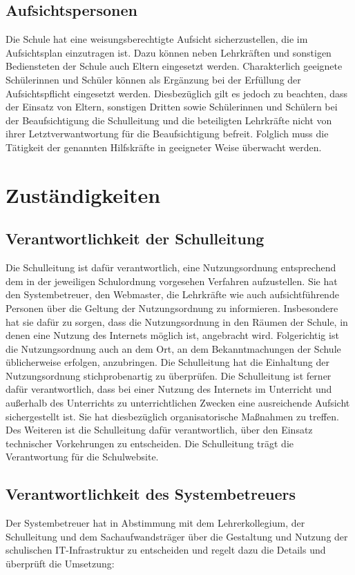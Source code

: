 \documentclass[a4paper, parskip]{scrartcl}
\begin{document}
\subsection{Aufsichtspersonen}
Die Schule hat eine weisungsberechtigte Aufsicht sicherzustellen, die im
Aufsichtsplan einzutragen ist. Dazu können neben Lehrkräften und sonstigen
Bediensteten der Schule auch Eltern eingesetzt werden. Charakterlich geeignete
Schülerinnen und Schüler können als Ergänzung bei der Erfüllung der
Aufsichtspflicht eingesetzt werden. Diesbezüglich gilt es jedoch zu beachten,
dass der Einsatz von Eltern, sonstigen Dritten sowie Schülerinnen und Schülern
bei der Beaufsichtigung die Schulleitung und die beteiligten Lehrkräfte nicht
von ihrer Letztverwantwortung für die Beaufsichtigung befreit. Folglich muss
die Tätigkeit der genannten Hilfskräfte in geeigneter Weise überwacht werden.

\section{Zuständigkeiten}
\subsection{Verantwortlichkeit der Schulleitung}
Die Schulleitung ist dafür verantwortlich, eine Nutzungsordnung entsprechend
dem in der jeweiligen Schulordnung vorgesehen Verfahren aufzustellen. Sie hat
den Systembetreuer, den Webmaster, die Lehrkräfte wie auch aufsichtführende
Personen über die Geltung der Nutzungsordnung zu informieren. Insbesondere hat
sie dafür zu sorgen, dass die Nutzungsordnung in den Räumen der Schule, in
denen eine Nutzung des Internets möglich ist, angebracht wird. Folgerichtig ist
die Nutzungsordnung auch an dem Ort, an dem Bekanntmachungen der Schule
üblicherweise erfolgen, anzubringen. Die Schulleitung hat die Einhaltung der
Nutzungsordnung stichprobenartig zu überprüfen. Die Schulleitung ist ferner
dafür verantwortlich, dass bei einer Nutzung des Internets im Unterricht und
außerhalb des Unterrichts zu unterrichtlichen Zwecken eine ausreichende
Aufsicht sichergestellt ist. Sie hat diesbezüglich organisatorische Maßnahmen
zu treffen. Des Weiteren ist die Schulleitung dafür verantwortlich, über den
Einsatz technischer Vorkehrungen zu entscheiden.
Die Schulleitung trägt die Verantwortung für die Schulwebsite.
\subsection{Verantwortlichkeit des Systembetreuers}
Der Systembetreuer hat in Abstimmung mit dem Lehrerkollegium, der Schulleitung
und dem Sachaufwandsträger über die Gestaltung und Nutzung der schulischen
IT-Infrastruktur zu entscheiden und regelt dazu die Details und überprüft die
Umsetzung:
\end{document}
